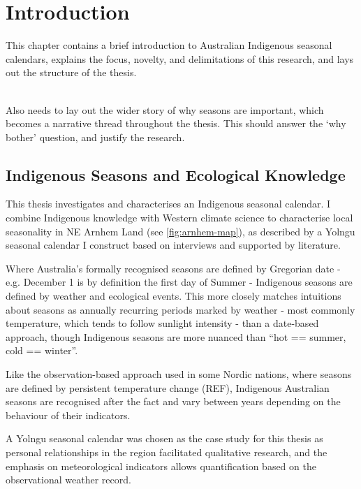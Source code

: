 \chapter{Introduction}
This chapter contains a brief introduction to Australian Indigenous seasonal calendars,
explains the focus, novelty, and delimitations of this research,
and lays out the structure of the thesis.

~\\

Also needs to lay out the wider story of why seasons are important,
which becomes a narrative thread throughout the thesis.
This should answer the `why bother' question, and justify the research.


\section{Indigenous Seasons and Ecological Knowledge}


This thesis investigates and characterises an Indigenous seasonal calendar.
I combine Indigenous knowledge with Western climate science to characterise
local seasonality in NE Arnhem Land (see \autoref{fig:arnhem-map}),
as described by a Yolngu seasonal calendar I construct based on
interviews and supported by literature.


Where Australia's formally recognised seasons are defined by Gregorian date -
e.g. December 1 is by definition the first day of Summer - Indigenous seasons
are defined by weather and ecological events.
%
This more closely matches intuitions about seasons as annually recurring
periods marked by weather - most commonly temperature, which tends to
follow sunlight intensity - than a date-based approach, though Indigenous
seasons are more nuanced than ``hot == summer, cold == winter''.

Like the observation-based approach used in some Nordic nations, where
seasons are defined by persistent temperature change (REF),
Indigenous Australian seasons are recognised after the fact and vary
between years depending on the behaviour of their indicators.


A Yolngu seasonal calendar was chosen as the case study for this thesis
as personal relationships in the region facilitated qualitative research,
and the emphasis on meteorological indicators allows quantification based
on the observational weather record.
    


